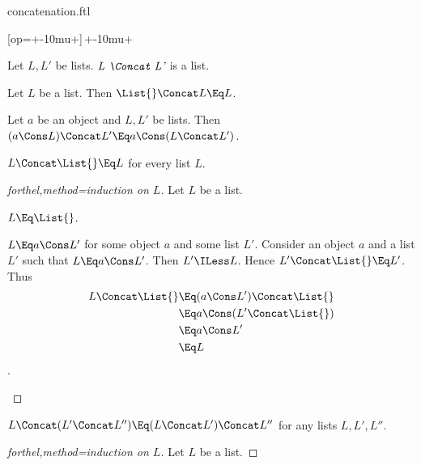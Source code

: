 \documentclass{stex}
\begin{document}
\begin{smodule}{concatenation.ftl}


[op=+\mkern-10mu+]{\,\comp+\mkern-10mu\comp+\,}


\begin{signature*}[forthel,for=Concat]
  Let $L, L'$ be lists.
  $\emph{L \Concat L'}$ is a list.
\end{signature*}

\begin{axiom*}[forthel,for=Concat]
  Let $L$ be a list.
  Then $\List{} \Concat L \Eq L$.
\end{axiom*}

\begin{axiom*}[forthel,for=Concat]
  Let $a$ be an object and $L, L'$ be lists.
  Then $(a \Cons L) \Concat L' \Eq a \Cons (L \Concat L')$.
\end{axiom*}

\begin{proposition*}[forthel]
  $L \Concat \List{} \Eq L$ for every list $L$.
\end{proposition*}
\begin{proof}[forthel,method=induction on $L$]
  Let $L$ be a list.

  \begin{case}{$L \Eq \List{}$.} \end{case}
  
  \begin{case}{$L \Eq a \Cons L'$ for some object $a$ and some list $L'$.}
    Consider an object $a$ and a list $L'$ such that $L \Eq a \Cons L'$.
    Then $L' \ILess L$.
    Hence $L' \Concat \List{} \Eq L'$.
    Thus
    \begin{align*}
      L \Concat \List{}
        &\Eq (a \Cons L') \Concat \List{}\\
        &\Eq a \Cons (L' \Concat \List{})\\
        &\Eq a \Cons L'\\
        &\Eq L
    \end{align*}.
  \end{case}
\end{proof}

\begin{proposition*}[forthel,name=associativity of concatenation]
  $L \Concat (L' \Concat L'') \Eq (L \Concat L') \Concat L''$ for any lists $L, L', L''$.
\end{proposition*}
\begin{proof}[forthel,method=induction on $L$]
  Let $L$ be a list.


\end{proof}
\end{smodule}
\end{document}
